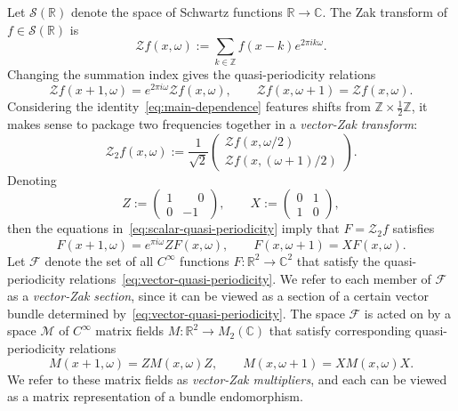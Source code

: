 \documentclass[10pt,a4paper]{amsart}
\newcommand{\R}{\mathbb{R}}
\newcommand{\C}{\mathbb{C}}
\newcommand{\Z}{\mathbb{Z}}
\newcommand{\Sch}{\mathcal{S}}
\newcommand{\Zak}{\mathcal{Z}}
\newcommand{\vZak}{\mathcal{Z}_2}
\begin{document}
Let $\Sch(\R)$ denote the space of Schwartz functions $\R\to\C$.
The Zak transform of $f\in\Sch(\R)$ is
\[
\Zak f(x,\omega)
  :=\sum_{k\in\Z}f(x-k)e^{2\pi i k\omega}.
\]
Changing the summation index gives the quasi-periodicity relations
\begin{equation}\label{eq:scalar-quasi-periodicity}
  \Zak f(x+1,\omega)=e^{2\pi i\omega}\Zak f(x,\omega),
  \qquad
  \Zak f(x,\omega+1)=\Zak f(x,\omega).
\end{equation}
Considering the identity~\eqref{eq:main-dependence} features shifts from $\mathbb{Z}\times\frac{1}{2}\mathbb{Z}$, it makes sense to package two frequencies together in a \textit{vector-Zak transform}:
\[
  \vZak f(x,\omega)
  :=\frac1{\sqrt2}
  \begin{pmatrix}
    \Zak f(x,\omega/2)\\
    \Zak f(x,(\omega+1)/2)
  \end{pmatrix}.
\]
Denoting
\begin{equation}
\label{eq.ZnX}
Z:=\begin{pmatrix}1&\phantom{-}0\\0&-1\end{pmatrix},
\qquad
X:=\begin{pmatrix}0&1\\1&0\end{pmatrix},
\end{equation}
then the equations in~\eqref{eq:scalar-quasi-periodicity} imply that $F=\vZak f$ satisfies
\begin{equation}\label{eq:vector-quasi-periodicity}
  F(x+1,\omega)=e^{\pi i\omega}ZF(x,\omega),
  \qquad
  F(x,\omega+1)=XF(x,\omega).
\end{equation}
Let $\mathcal{F}$ denote the set of all $C^\infty$ functions $F\colon \R^2\to\C^2$ that satisfy the quasi-periodicity relations~\eqref{eq:vector-quasi-periodicity}.
We refer to each member of $\mathcal{F}$ as a \textit{vector-Zak section}, since it can be viewed as a section of a certain vector bundle determined by~\eqref{eq:vector-quasi-periodicity}.
The space $\mathcal{F}$ is acted on by a space $\mathcal{M}$ of $C^\infty$ matrix fields $M\colon\R^2\to M_2(\C)$ that satisfy corresponding quasi-periodicity relations
\begin{equation}\label{eq:matrix-quasi-periodicity}
M(x+1,\omega)=ZM(x,\omega)Z,
  \qquad  M(x,\omega+1)=XM(x,\omega)X.
\end{equation}
We refer to these matrix fields as \textit{vector-Zak multipliers}, and each can be viewed as a matrix representation of a bundle endomorphism.
\end{document}
